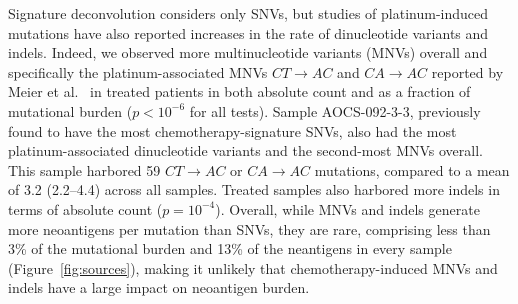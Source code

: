 Signature deconvolution considers only SNVs, but studies of platinum-induced mutations have also reported increases in the rate of dinucleotide variants and indels. Indeed, we observed more multinucleotide variants (MNVs) overall and specifically the platinum-associated MNVs $CT \rightarrow AC$ and $CA \rightarrow AC$ reported by Meier et al.~\cite{Meier_2014} in treated patients in both absolute count and as a fraction of mutational burden ($p < 10^{-6}$ for all tests). Sample AOCS-092-3-3, previously found to have the most chemotherapy-signature SNVs, also had the most platinum-associated dinucleotide variants and the second-most MNVs overall. This sample harbored 59 $CT \rightarrow AC$ or $CA \rightarrow AC$ mutations, compared to a mean of 3.2 (2.2--4.4) across all samples. Treated samples also harbored more indels in terms of absolute count ($p=10^{-4}$). Overall, while MNVs and indels generate more neoantigens per mutation than SNVs, they are rare, comprising less than 3\% of the mutational burden and 13\% of the neantigens in every sample (Figure~\ref{fig:sources}), making it unlikely that chemotherapy-induced MNVs and indels have a large impact on neoantigen burden.

